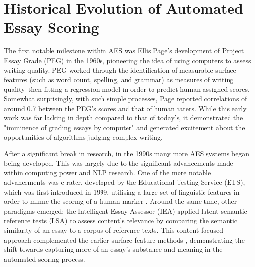 \documentclass[8pt]{report}
\begin{document}
\section{Historical Evolution of Automated Essay Scoring}
The first notable milestone within AES was Ellis Page’s development of Project Essay Grade (PEG) in the 1960s, pioneering the idea of using computers to assess writing quality. PEG worked through the identification of measurable surface features (such as word count, spelling, and grammar) as measures of writing quality, then fitting a 
regression model in order to predict human-assigned scores. Somewhat surprisingly, with such simple processes, Page reported correlations of around 0.7 between the PEG's scores and that of human raters. While this early work was far lacking in depth compared to that of today’s, it demonstrated the "imminence of grading essays by computer" 
\parencite{page1966imminence} and generated excitement about the opportunities of algorithms judging complex writing.

After a significant break in research, in the 1990s many more AES systems began being developed. This was largely due to the significant advancements made within computing power and NLP research. One of the more notable advancements was e-rater, developed by the Educational Testing Service (ETS), which was first introduced in 1999, 
utilising a large set of linguistic features in order to mimic the scoring of a human marker \parencite{e-rater2006}. Around the same time, other paradigms emerged: the Intelligent Essay Assessor (IEA) applied latent semantic reference tests (LSA) to assess content's relevance by comparing the semantic similarity of an essay to a corpus of 
reference texts. This content-focused approach complemented the earlier surface-feature methods \parencite{landauer2003iea}, demonstrating the shift towards capturing more of an essay's substance and meaning in the automated scoring process.
\end{document}
